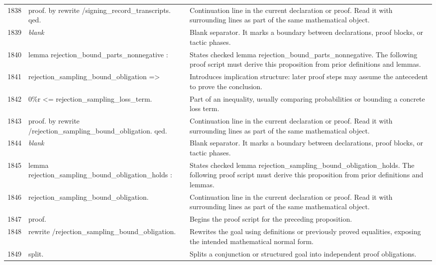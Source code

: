 \documentclass[10pt]{article}
\begin{document}
\begin{longtable}{r L{0.53\textwidth} L{0.37\textwidth}}
1838 & {\ttfamily\scriptsize proof. by rewrite /signing\_record\_transcripts. qed.} & Continuation line in the current declaration or proof.  Read it with surrounding lines as part of the same mathematical object. \\
1839 & {\ttfamily\scriptsize \emph{blank}} & Blank separator.  It marks a boundary between declarations, proof blocks, or tactic phases. \\
1840 & {\ttfamily\scriptsize lemma rejection\_bound\_parts\_nonnegative :} & States checked lemma rejection\_bound\_parts\_nonnegative.  The following proof script must derive this proposition from prior definitions and lemmas. \\
1841 & {\ttfamily\scriptsize   rejection\_sampling\_bound\_obligation =>} & Introduces implication structure: later proof steps may assume the antecedent to prove the conclusion. \\
1842 & {\ttfamily\scriptsize   0\%r <= rejection\_sampling\_loss\_term.} & Part of an inequality, usually comparing probabilities or bounding a concrete loss term. \\
1843 & {\ttfamily\scriptsize proof. by rewrite /rejection\_sampling\_bound\_obligation. qed.} & Continuation line in the current declaration or proof.  Read it with surrounding lines as part of the same mathematical object. \\
1844 & {\ttfamily\scriptsize \emph{blank}} & Blank separator.  It marks a boundary between declarations, proof blocks, or tactic phases. \\
1845 & {\ttfamily\scriptsize lemma rejection\_sampling\_bound\_obligation\_holds :} & States checked lemma rejection\_sampling\_bound\_obligation\_holds.  The following proof script must derive this proposition from prior definitions and lemmas. \\
1846 & {\ttfamily\scriptsize   rejection\_sampling\_bound\_obligation.} & Continuation line in the current declaration or proof.  Read it with surrounding lines as part of the same mathematical object. \\
1847 & {\ttfamily\scriptsize proof.} & Begins the proof script for the preceding proposition. \\
1848 & {\ttfamily\scriptsize rewrite /rejection\_sampling\_bound\_obligation.} & Rewrites the goal using definitions or previously proved equalities, exposing the intended mathematical normal form. \\
1849 & {\ttfamily\scriptsize split.} & Splits a conjunction or structured goal into independent proof obligations. \\

\end{longtable}
\end{document}
